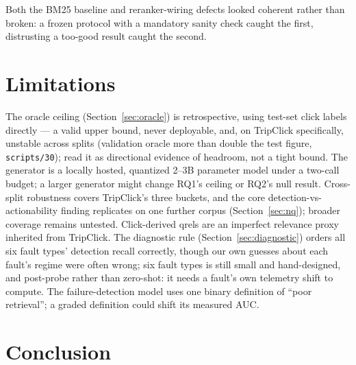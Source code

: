 \documentclass[conference]{IEEEtran}
\begin{document}
Both the BM25 baseline and reranker-wiring defects looked coherent
rather than broken: a frozen protocol with a mandatory sanity check
caught the first, distrusting a too-good result caught the second.

\section{Limitations}
\label{sec:limitations}

The oracle ceiling (Section~\ref{sec:oracle}) is retrospective, using
test-set click labels directly --- a valid upper bound, never
deployable, and, on TripClick specifically, unstable across splits
(validation oracle more than double the test figure, \texttt{scripts/30});
read it as directional evidence of headroom, not a tight bound. The
generator is a locally hosted, quantized 2--3B
parameter model under a two-call budget; a larger generator might
change RQ1's ceiling or RQ2's null result. Cross-split robustness
covers TripClick's three buckets, and the core detection-vs-actionability
finding replicates on one further corpus (Section~\ref{sec:nq}); broader
coverage remains untested. Click-derived qrels are an imperfect
relevance proxy inherited from TripClick. The diagnostic rule
(Section~\ref{sec:diagnostic}) orders all six fault types' detection
recall correctly, though our own guesses about each fault's regime
were often wrong; six fault types is still small and hand-designed,
and post-probe rather than zero-shot: it needs a fault's own telemetry
shift to compute. The failure-detection model uses one binary
definition of ``poor retrieval''; a graded definition could shift its
measured AUC.

\section{Conclusion}
\end{document}
